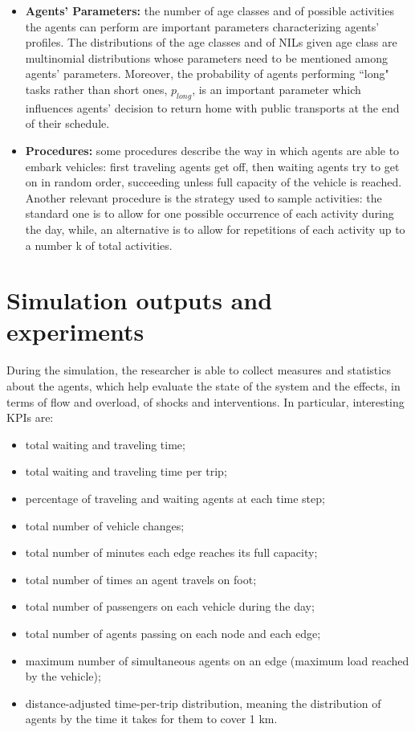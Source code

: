 \begin{itemize}
\item \textbf{Agents' Parameters:} the number of age classes and of possible activities the agents can perform are important parameters characterizing agents' profiles. The distributions of the age classes and of NILs given age class are multinomial distributions whose parameters need to be mentioned among agents' parameters. Moreover, the probability of agents performing ``long" tasks rather than short ones, $p_{long}$, is an important parameter which influences agents' decision to return home with public transports at the end of their schedule.
\item \textbf{Procedures:} some procedures describe the way in which agents are able to embark vehicles: first traveling agents get off, then waiting agents try to get on in random order, succeeding unless full capacity of the vehicle is reached. Another relevant procedure is the strategy used to sample activities: the standard one is to allow for one possible occurrence of each activity during the day, while, an alternative is to allow for repetitions of each activity up to a number k of total activities. 
\end{itemize}


\section{Simulation outputs and experiments}\label{sec:3.5}
During the simulation, the researcher is able to collect measures and statistics about the agents, which help evaluate the state of the system and the effects, in terms of flow and overload, of shocks and interventions. 
In particular, interesting KPIs are:
\begin{itemize}
    \item total waiting and traveling time;
    \item total waiting and traveling time per trip;
    \item percentage of traveling and waiting agents at each time step;
    \item total number of vehicle changes;
    \item total number of minutes each edge reaches its full capacity;
    \item total number of times an agent travels on foot;
    \item total number of passengers on each vehicle during the day;
    \item total number of agents passing on each node and each edge;
    \item maximum number of simultaneous agents on an edge (maximum load reached by the vehicle);
    \item distance-adjusted time-per-trip distribution, meaning the distribution of agents by the time it takes for them to cover 1 km.
\end{itemize}

